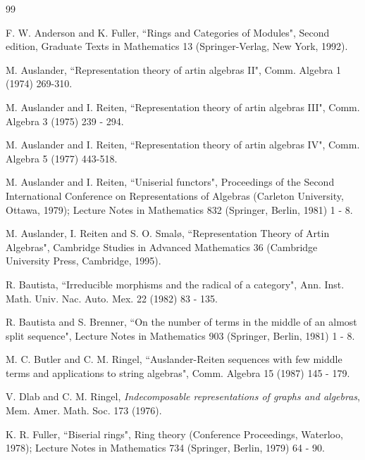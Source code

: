 \documentclass[10pt]{amsart}
\theoremstyle{definition}
\begin{document}
\begin{thebibliography}{99}

 {\sc F. W. Anderson and K. Fuller}, ``Rings and Categories of Modules", Second edition, Gra\-duate Texts in Mathematics 13 (Springer-Verlag, New York, 1992). 

 {\sc M. Auslander}, ``Representation theory of artin algebras II", Comm. Algebra 1 (1974) 269-310.

 {\sc M. Auslander and I. Reiten}, ``Representation theory of artin algebras III", Comm. Algebra 3 (1975) 239 - 294.

 {\sc M. Auslander and I. Reiten,} ``Representation theory of artin algebras IV", Comm. Algebra 5 (1977) 443-518.

 {\sc M. Auslander and I. Reiten}, ``Uniserial functors", Proceedings of the Second International Conference on Representations of Algebras (Carleton University, Ottawa, 1979); Lecture
Notes in Mathematics 832 (Springer, Berlin, 1981) 1 - 8.

 {\sc M. Auslander, I. Reiten and S. O. Smal\o,} ``Representation Theory of Artin Algebras", Cambridge Studies in Advanced Mathematics 36 (Cambridge University Press, Cambridge, 1995).

 {\sc R. Bautista}, ``Irreducible morphisms and the radical of a category", Ann. Inst. Math. Univ. Nac. Auto. Mex. 22 (1982) 83 - 135.

 {\sc R. Bautista and S. Brenner}, ``On the number of terms in the middle of an almost split sequence", Lecture Notes in Mathematics 903 (Springer, Berlin, 1981) 1 - 8.

 {\sc M. C. Butler and C. M. Ringel}, ``Auslander-Reiten sequences with few middle terms and applications to string algebras", Comm. Algebra 15 (1987) 145 - 179.


 V. Dlab and C. M. Ringel, \emph{Indecomposable representations of graphs and algebras}, Mem. Amer. Math. Soc. 173 (1976).


 {\sc K. R. Fuller}, ``Biserial rings",  Ring theory (Conference Proceedings, Waterloo, 1978); Lecture Notes in Mathematics 734 (Springer, Berlin, 1979) 64 - 90.


\end{thebibliography}
\end{document}
